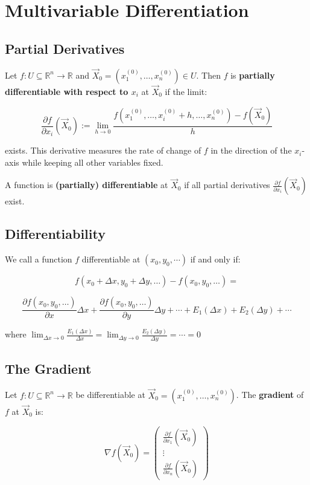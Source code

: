 \section{Multivariable Differentiation}

\subsection{Partial Derivatives}

Let \( f : U \subseteq \mathbb{R}^n \to \mathbb{R} \) and \( \vec{X}_0 = (x_1^{(0)}, \dots, x_n^{(0)}) \in U \). Then \( f \) is \textbf{partially differentiable with respect to \( x_i \)} at \( \vec{X}_0 \) if the limit:

\[
\frac{\partial f}{\partial x_i}(\vec{X}_0) := \lim_{h \to 0} \frac{f(x_1^{(0)}, \dots, x_i^{(0)} + h, \dots, x_n^{(0)}) - f(\vec{X}_0)}{h}
\]

exists. This derivative measures the rate of change of \( f \) in the direction of the \( x_i \)-axis while keeping all other variables fixed.

A function is \textbf{(partially) differentiable} at \( \vec{X}_0 \) if all partial derivatives \( \frac{\partial f}{\partial x_i}(\vec{X}_0) \) exist.

\subsection{Differentiability}
We call a function \(f\) differentiable at \((x_0, y_0, \cdots)\) if and only if:

\[
f(x_0 + \Delta x, y_0 + \Delta y, \dots) - f(x_0, y_0, \dots) = 
\]

\[
\frac{\partial f(x_0, y_0, \dots)}{\partial x} \Delta x + \frac{\partial f(x_0, y_0, \dots)}{\partial y} \Delta y + \cdots + E_1(\Delta x) + E_2(\Delta y) + \cdots
\]

where \(\lim_{\Delta x \to 0}\frac{E_1(\Delta x)}{\Delta x} = \lim_{\Delta y \to 0}\frac{E_2(\Delta y)}{\Delta y} = \cdots = 0\)

\subsection{The Gradient}

Let \( f : U \subseteq \mathbb{R}^n \to \mathbb{R} \) be differentiable at \( \vec{X}_0 = (x_1^{(0)}, \dots, x_n^{(0)}) \). The \textbf{gradient} of \( f \) at \( \vec{X}_0 \) is:

\[
\nabla f(\vec{X}_0) = \begin{pmatrix}
\frac{\partial f}{\partial x_1}(\vec{X}_0) \\
\vdots \\
\frac{\partial f}{\partial x_n}(\vec{X}_0)
\end{pmatrix}
\]


